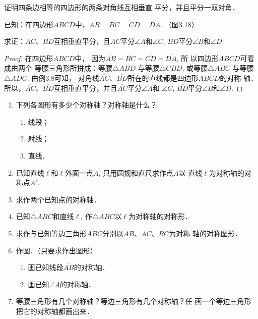 \begin{example}
    证明四条边相等的四边形的两条对角线互相垂直
平分，并且平分一双对角．

已知：在四边形$ABCD$中，$\overline{AB}=\overline{BC}=\overline{CD}=\overline{DA}$.
（图3.18）
\begin{figure}[htp]
    \centering
    \caption{}
\end{figure}

求证：$AC$、$BD$互相垂直平分，且$AC$平分$\angle A$和$\angle C$,
$BD$平分$\angle B$和$\angle D$.
\end{example}

\begin{proof}
在四边形$ABCD$中，
因为$\overline{AB}=\overline{BC}=\overline{CD}=\overline{DA}$, 所
以四边形$ABCD$可看成由两个
等腰三角形所拼成：等腰$\triangle ABD$
与等腰$\triangle CBD$, 或等腰$\triangle ABC$
与等腰$\triangle ADC$. 由例3.8可知，
对角线$\overline{AC}$、$\overline{BD}$所在的直线都是四边形$ABCD$的对称
轴．所以，$\overline{AC}$、$\overline{BD}$互相垂直平分，并且$\overline{AC}$平分$\angle A$和
$\angle C$, $\overline{BD}$平分$\angle B$和$\angle D$.
\end{proof}

\begin{ex}
\begin{enumerate}
    \item 下列各图形有多少个对称轴？对称轴是什么？
    \begin{multicols}{3}
        \begin{enumerate}
            \item 线段；\item 射线；\item 直线．
        \end{enumerate}
    \end{multicols}
    \item 已知直线$\ell$和$\ell$外面一点$A$, 只用圆规和直尺求作点$A$以
    直线$\ell$为对称轴的对称点$A'$.
    \item 求作两个已知点的对称轴．
    \item 已知$\triangle ABC$和直线$\ell$, 作$\triangle ABC$以$\ell$为对称轴的对称形．
    \item 求作与已知等边三角形$ABC$分别以$AB$、$AC$、$BC$为对称
    轴的对称图形．
    \item 作图．（只要求作出图形）
    \begin{enumerate}
    \item 画已知线段$\overline{AB}$的对称轴．
    \item 画已知$\angle A$的对称轴．
    \end{enumerate}
    \item 等腰三角形有几个对称轴？等边三角形有几个对称轴？任
    画一个等边三角形把它的对称轴都画出来．
\end{enumerate}
\end{ex}

